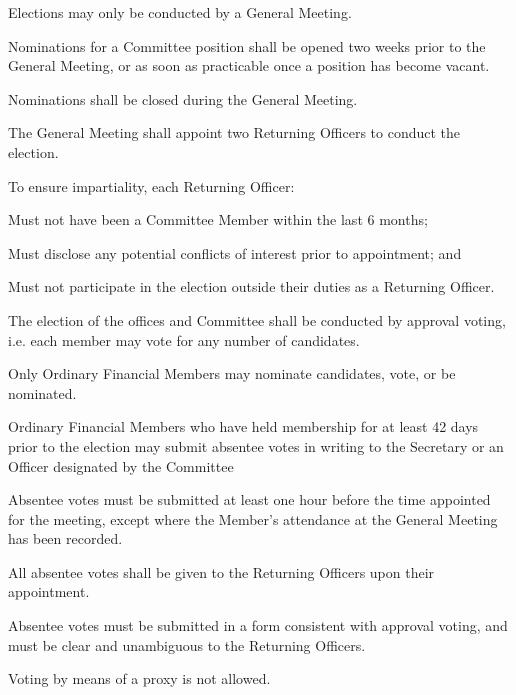 \documentclass[a4paper]{article}
\begin{document}
\begin{myEnumerate}
    \item Elections may only be conducted by a General Meeting.
    \item Nominations for a Committee position shall be opened two weeks prior to the General Meeting, or as soon as practicable once a position has become vacant.
    \item Nominations shall be closed during the General Meeting.
    \item The General Meeting shall appoint two Returning Officers to conduct the election.
        \begin{myEnumerate}
            \item To ensure impartiality, each Returning Officer:
                \begin{myEnumerate}
                    \item Must not have been a Committee Member within the last 6 months;
                    \item Must disclose any potential conflicts of interest prior to appointment; and
                    \item Must not participate in the election outside their duties as a Returning Officer.
                \end{myEnumerate}
        \end{myEnumerate}
    \item The election of the offices and Committee shall be conducted by approval voting, i.e. each member may vote for any number of candidates.
    \item Only Ordinary Financial Members may nominate candidates, vote, or be nominated.
        \begin{myEnumerate}
            \item Ordinary Financial Members who have held membership for at least 42 days prior to the election may submit absentee votes in writing to the Secretary or an Officer designated by the Committee
                \begin{myEnumerate}
                    \item Absentee votes must be submitted at least one hour before the time appointed for the meeting, except where the Member’s attendance at the General Meeting has been recorded.
                    \item All absentee votes shall be given to the Returning Officers upon their appointment.
                    \item Absentee votes must be submitted in a form consistent with approval voting, and must be clear and unambiguous to the Returning Officers.
                \end{myEnumerate}
            \item Voting by means of a proxy is not allowed.
        \end{myEnumerate}
\end{myEnumerate}
\end{document}
